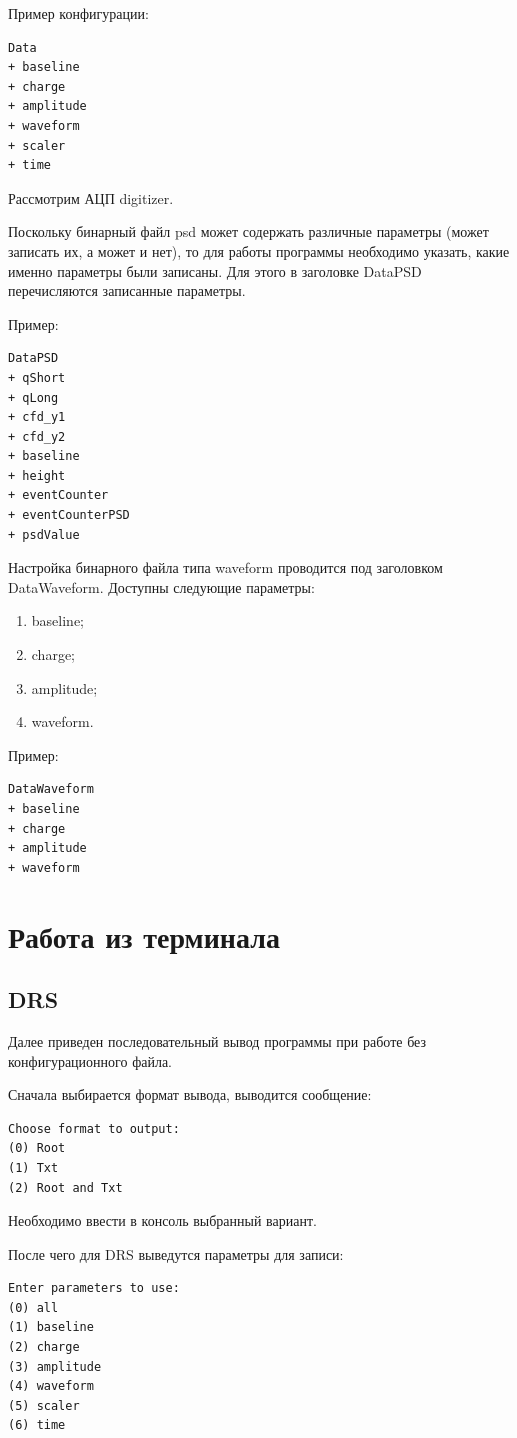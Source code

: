 \documentclass[12pt,a4paper,openany]{article}
\begin{document}
Пример конфигурации:
\begin{lstlisting}
Data
+ baseline
+ charge
+ amplitude
+ waveform
+ scaler
+ time
\end{lstlisting}

Рассмотрим АЦП digitizer.

Поскольку бинарный файл psd может содержать различные параметры (может записать их, а может и нет), то для работы программы необходимо указать, какие именно параметры были записаны.
Для этого в заголовке DataPSD перечисляются записанные параметры.

Пример:
\begin{lstlisting}
DataPSD
+ qShort
+ qLong
+ cfd_y1
+ cfd_y2
+ baseline
+ height
+ eventCounter
+ eventCounterPSD
+ psdValue
\end{lstlisting}

Настройка бинарного файла типа waveform проводится под заголовком DataWaveform.
Доступны следующие параметры:
\begin{enumerate}
    \item baseline;
    \item charge;
    \item amplitude;
    \item waveform.
\end{enumerate}

Пример:
\begin{lstlisting}
DataWaveform
+ baseline
+ charge
+ amplitude
+ waveform
\end{lstlisting}

\section{Работа из терминала}
\subsection{DRS}
Далее приведен последовательный вывод программы при работе без конфигурационного файла. 

Сначала выбирается формат вывода, выводится сообщение:
\begin{lstlisting}
Choose format to output:
(0) Root
(1) Txt
(2) Root and Txt
\end{lstlisting}

Необходимо ввести в консоль выбранный вариант.

После чего для DRS выведутся параметры для записи:
\begin{lstlisting}
Enter parameters to use:
(0) all
(1) baseline
(2) charge
(3) amplitude
(4) waveform
(5) scaler
(6) time
\end{lstlisting}
\end{document}
